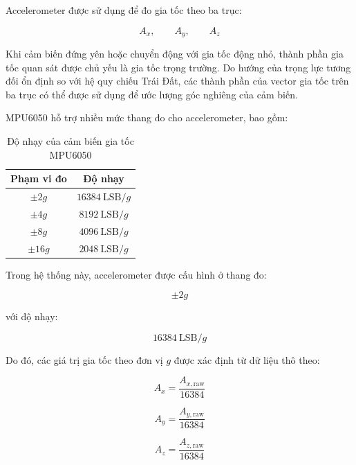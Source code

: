 \documentclass[a4paper,12pt]{report}
\begin{document}
Accelerometer được sử dụng để đo gia tốc theo ba trục:

\begin{equation}
A_x,\qquad A_y,\qquad A_z
\end{equation}

Khi cảm biến đứng yên hoặc chuyển động với gia tốc động nhỏ, thành phần gia tốc quan sát được chủ yếu là gia tốc trọng trường. Do hướng của trọng lực tương đối ổn định so với hệ quy chiếu Trái Đất, các thành phần của vector gia tốc trên ba trục có thể được sử dụng để ước lượng góc nghiêng của cảm biến.

MPU6050 hỗ trợ nhiều mức thang đo cho accelerometer, bao gồm:

\begin{table}[H]
\centering
\begin{tabular}{|c|c|}
\hline
\textbf{Phạm vi đo} & \textbf{Độ nhạy} \\ \hline
$\pm 2g$  & $16384\ \text{LSB}/g$ \\ \hline
$\pm 4g$  & $8192\ \text{LSB}/g$ \\ \hline
$\pm 8g$  & $4096\ \text{LSB}/g$ \\ \hline
$\pm 16g$ & $2048\ \text{LSB}/g$ \\ \hline
\end{tabular}
\caption{Độ nhạy của cảm biến gia tốc MPU6050}
\label{tab:mpu6050_accel_sensitivity}
\end{table}

Trong hệ thống này, accelerometer được cấu hình ở thang đo:

\begin{equation}
\pm 2g
\end{equation}

với độ nhạy:

\begin{equation}
16384\ \text{LSB}/g
\end{equation}

Do đó, các giá trị gia tốc theo đơn vị $g$ được xác định từ dữ liệu
thô theo:

\begin{equation}
A_x = \frac{A_{x,\text{raw}}}{16384}
\end{equation}

\begin{equation}
A_y = \frac{A_{y,\text{raw}}}{16384}
\end{equation}

\begin{equation}
A_z = \frac{A_{z,\text{raw}}}{16384}
\end{equation}
\end{document}
